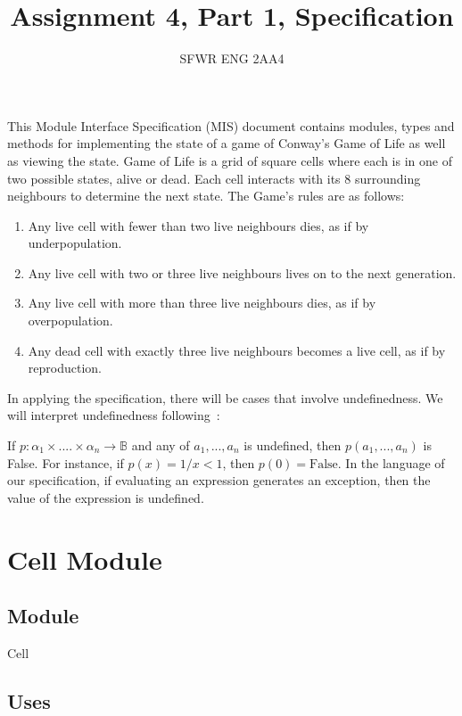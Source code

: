 \documentclass[12pt]{article}
\title{Assignment 4, Part 1, Specification}
\author{SFWR ENG 2AA4}
\begin{document}
\maketitle
This Module Interface Specification (MIS) document contains modules, types and
methods for implementing the state of a game of Conway's Game of Life as well as viewing
the state. Game of Life is a grid of square cells where each is in one of two possible states,
alive or dead. Each cell interacts with its 8 surrounding neighbours to determine the next state.
The Game's rules are as follows:

\begin{enumerate}
\item Any live cell with fewer than two live neighbours dies, as if by underpopulation.
\item Any live cell with two or three live neighbours lives on to the next generation.
\item Any live cell with more than three live neighbours dies, as if by overpopulation.
\item Any dead cell with exactly three live neighbours becomes a live cell, as if by reproduction.
\end{enumerate}



In applying the specification, there will be cases that involve undefinedness.
We will interpret undefinedness following~\cite{Farmer2004}:

If $p: \alpha_1 \times .... \times \alpha_n \rightarrow \mathbb{B}$ and any of
$a_1, ..., a_n$ is undefined, then $p(a_1, ..., a_n)$ is False.  For instance,
if $p(x) = 1/x < 1$, then $p(0) = \text{False}$.  In the language of our
specification, if evaluating an expression generates an exception, then the
value of the expression is undefined.




\newpage

\section* {Cell Module}

\subsection*{Module}

Cell

\subsection* {Uses}
\end{document}
